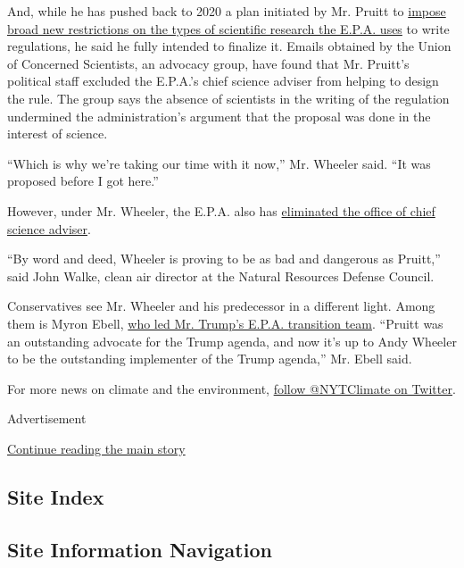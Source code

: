 And, while he has pushed back to 2020 a plan initiated by Mr. Pruitt to
\href{https://www.nytimes.com/2018/03/26/climate/epa-scientific-transparency-honest-act.html}{impose
broad new restrictions on the types of scientific research the E.P.A.
uses} to write regulations, he said he fully intended to finalize it.
Emails obtained by the Union of Concerned Scientists, an advocacy group,
have found that Mr. Pruitt's political staff excluded the E.P.A.'s chief
science adviser from helping to design the rule. The group says the
absence of scientists in the writing of the regulation undermined the
administration's argument that the proposal was done in the interest of
science.

``Which is why we're taking our time with it now,'' Mr. Wheeler said.
``It was proposed before I got here.''

However, under Mr. Wheeler, the E.P.A. also has
\href{https://www.nytimes.com/2018/09/27/climate/epa-science-adviser.html}{eliminated
the office of chief science adviser}.

``By word and deed, Wheeler is proving to be as bad and dangerous as
Pruitt,'' said John Walke, clean air director at the Natural Resources
Defense Council.

Conservatives see Mr. Wheeler and his predecessor in a different light.
Among them is Myron Ebell,
\href{https://www.nytimes.com/2016/11/12/science/myron-ebell-trump-epa.html?module=inline}{who
led Mr. Trump's E.P.A. transition team}. ``Pruitt was an outstanding
advocate for the Trump agenda, and now it's up to Andy Wheeler to be the
outstanding implementer of the Trump agenda,'' Mr. Ebell said.

For more news on climate and the environment,
\href{https://twitter.com/nytclimate}{follow @NYTClimate on Twitter}.

Advertisement

\protect\hyperlink{after-bottom}{Continue reading the main story}

\hypertarget{site-index}{%
\subsection{Site Index}\label{site-index}}

\hypertarget{site-information-navigation}{%
\subsection{Site Information
Navigation}\label{site-information-navigation}}

